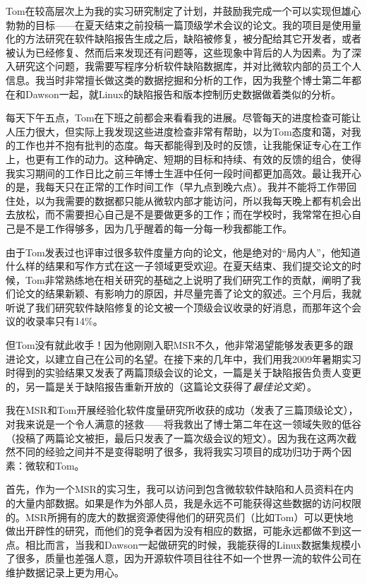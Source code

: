 \documentclass[letter,12pt]{book}
\begin{document}
\begin{CJK}{UTF8}{gbsn}
\breakline

Tom在较高层次上为我的实习研究制定了计划，并鼓励我完成一个可以实现但雄心勃勃的目标——在夏天结束之前投稿一篇顶级学术会议的论文。我的项目是使用量化的方法研究在软件缺陷报告生成之后，缺陷被修复，被分配给其它开发者，或者被认为已经修复、然而后来发现还有问题等，这些现象中背后的人为因素。为了深入研究这个问题，我需要写程序分析软件缺陷数据库，并对比微软内部的员工个人信息。我当时非常擅长做这类的数据挖掘和分析的工作，因为我整个博士第二年都在和Dawson一起，就Linux的缺陷报告和版本控制历史数据做着类似的分析。

每天下午五点，Tom在下班之前都会来看看我的进展。尽管每天的进度检查可能让人压力很大，但实际上我发现这些进度检查非常有帮助，以为Tom态度和蔼，对我的工作也并不抱有批判的态度。每天都能得到及时的反馈，让我能保证专心在工作上，也更有工作的动力。这种确定、短期的目标和持续、有效的反馈的组合，使得我实习期间的工作日比之前三年博士生涯中任何一段时间都更加高效。最让我开心的是，我每天只在正常的工作时间工作（早九点到晚六点）。我并不能将工作带回住处，以为我需要的数据都只能从微软内部才能访问，所以我每天晚上都有机会出去放松，而不需要担心自己是不是要做更多的工作；而在学校时，我常常在担心自己是不是工作得够多，因为几乎醒着的每一分每一秒我都能工作。

由于Tom发表过也评审过很多软件度量方向的论文，他是绝对的“局内人”，他知道什么样的结果和写作方式在这一子领域更受欢迎。在夏天结束、我们提交论文的时候，Tom非常熟练地在相关研究的基础之上说明了我们研究工作的贡献，阐明了我们论文的结果新颖、有影响力的原因，并尽量完善了论文的叙述。三个月后，我就听说了我们研究软件缺陷修复的论文被一个顶级会议收录的好消息，而那年这个会议的收录率只有14\%。

但Tom没有就此收手！因为他刚刚入职MSR不久，他非常渴望能够发表更多的跟进论文，以建立自己在公司的名望。在接下来的几年中，我们用我2009年暑期实习时得到的实验结果又发表了两篇顶级会议的论文，一篇是关于缺陷报告负责人变更的，另一篇是关于缺陷报告重新开放的（这篇论文获得了\emph{最佳论文奖}）。

\breakline

我在MSR和Tom开展经验化软件度量研究所收获的成功（发表了三篇顶级论文），对我来说是一个令人满意的拯救——将我救出了博士第二年在这一领域失败的低谷（投稿了两篇论文被拒，最后只发表了一篇次级会议的短文）。因为我在这两次截然不同的经验之间并不是变得聪明了很多，我将我实习项目的成功归功于两个因素：微软和Tom。

首先，作为一个MSR的实习生，我可以访问到包含微软软件缺陷和人员资料在内的大量内部数据。如果是作为外部人员，我是永远不可能获得这些数据的访问权限的。MSR所拥有的庞大的数据资源使得他们的研究员们（比如Tom）可以更快地做出开辟性的研究，而他们的竞争者因为没有相应的数据，可能永远都做不到这一点。相比而言，当我和Dawson一起做研究的时候，我能获得的Linux数据集规模小了很多，质量也差强人意，因为开源软件项目往往不如一个世界一流的软件公司在维护数据记录上更为用心。


\end{CJK}
\end{document}
